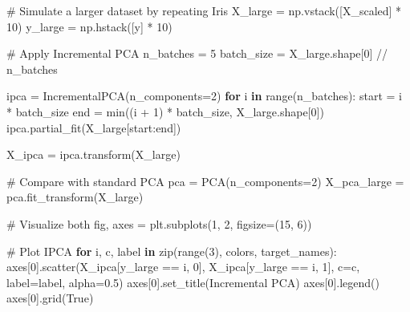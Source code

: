 \documentclass[
  letterpaper,
  DIV=11,
  numbers=noendperiod]{scrreprt}
\newenvironment{Shaded}{\begin{snugshade}}{\end{snugshade}}
\newcommand{\BuiltInTok}[1]{\textcolor[rgb]{0.00,0.23,0.31}{#1}}
\newcommand{\CommentTok}[1]{\textcolor[rgb]{0.37,0.37,0.37}{#1}}
\newcommand{\ControlFlowTok}[1]{\textcolor[rgb]{0.00,0.23,0.31}{\textbf{#1}}}
\newcommand{\DecValTok}[1]{\textcolor[rgb]{0.68,0.00,0.00}{#1}}
\newcommand{\FloatTok}[1]{\textcolor[rgb]{0.68,0.00,0.00}{#1}}
\newcommand{\KeywordTok}[1]{\textcolor[rgb]{0.00,0.23,0.31}{\textbf{#1}}}
\newcommand{\NormalTok}[1]{\textcolor[rgb]{0.00,0.23,0.31}{#1}}
\newcommand{\OperatorTok}[1]{\textcolor[rgb]{0.37,0.37,0.37}{#1}}
\newcommand{\StringTok}[1]{\textcolor[rgb]{0.13,0.47,0.30}{#1}}
\newcommand{\VariableTok}[1]{\textcolor[rgb]{0.07,0.07,0.07}{#1}}
\begin{document}
\begin{Shaded}
\begin{Highlighting}[]
\CommentTok{\# Simulate a larger dataset by repeating Iris}
\NormalTok{X\_large }\OperatorTok{=}\NormalTok{ np.vstack([X\_scaled] }\OperatorTok{*} \DecValTok{10}\NormalTok{)}
\NormalTok{y\_large }\OperatorTok{=}\NormalTok{ np.hstack([y] }\OperatorTok{*} \DecValTok{10}\NormalTok{)}

\CommentTok{\# Apply Incremental PCA}
\NormalTok{n\_batches }\OperatorTok{=} \DecValTok{5}
\NormalTok{batch\_size }\OperatorTok{=}\NormalTok{ X\_large.shape[}\DecValTok{0}\NormalTok{] }\OperatorTok{//}\NormalTok{ n\_batches}

\NormalTok{ipca }\OperatorTok{=}\NormalTok{ IncrementalPCA(n\_components}\OperatorTok{=}\DecValTok{2}\NormalTok{)}
\ControlFlowTok{for}\NormalTok{ i }\KeywordTok{in} \BuiltInTok{range}\NormalTok{(n\_batches):}
\NormalTok{    start }\OperatorTok{=}\NormalTok{ i }\OperatorTok{*}\NormalTok{ batch\_size}
\NormalTok{    end }\OperatorTok{=} \BuiltInTok{min}\NormalTok{((i }\OperatorTok{+} \DecValTok{1}\NormalTok{) }\OperatorTok{*}\NormalTok{ batch\_size, X\_large.shape[}\DecValTok{0}\NormalTok{])}
\NormalTok{    ipca.partial\_fit(X\_large[start:end])}

\NormalTok{X\_ipca }\OperatorTok{=}\NormalTok{ ipca.transform(X\_large)}

\CommentTok{\# Compare with standard PCA}
\NormalTok{pca }\OperatorTok{=}\NormalTok{ PCA(n\_components}\OperatorTok{=}\DecValTok{2}\NormalTok{)}
\NormalTok{X\_pca\_large }\OperatorTok{=}\NormalTok{ pca.fit\_transform(X\_large)}

\CommentTok{\# Visualize both}
\NormalTok{fig, axes }\OperatorTok{=}\NormalTok{ plt.subplots(}\DecValTok{1}\NormalTok{, }\DecValTok{2}\NormalTok{, figsize}\OperatorTok{=}\NormalTok{(}\DecValTok{15}\NormalTok{, }\DecValTok{6}\NormalTok{))}

\CommentTok{\# Plot IPCA}
\ControlFlowTok{for}\NormalTok{ i, c, label }\KeywordTok{in} \BuiltInTok{zip}\NormalTok{(}\BuiltInTok{range}\NormalTok{(}\DecValTok{3}\NormalTok{), colors, target\_names):}
\NormalTok{    axes[}\DecValTok{0}\NormalTok{].scatter(X\_ipca[y\_large }\OperatorTok{==}\NormalTok{ i, }\DecValTok{0}\NormalTok{], X\_ipca[y\_large }\OperatorTok{==}\NormalTok{ i, }\DecValTok{1}\NormalTok{], c}\OperatorTok{=}\NormalTok{c, label}\OperatorTok{=}\NormalTok{label, alpha}\OperatorTok{=}\FloatTok{0.5}\NormalTok{)}
\NormalTok{axes[}\DecValTok{0}\NormalTok{].set\_title(}\StringTok{\textquotesingle{}Incremental PCA\textquotesingle{}}\NormalTok{)}
\NormalTok{axes[}\DecValTok{0}\NormalTok{].legend()}
\NormalTok{axes[}\DecValTok{0}\NormalTok{].grid(}\VariableTok{True}\NormalTok{)}


\end{Highlighting}
\end{Shaded}
\end{document}
